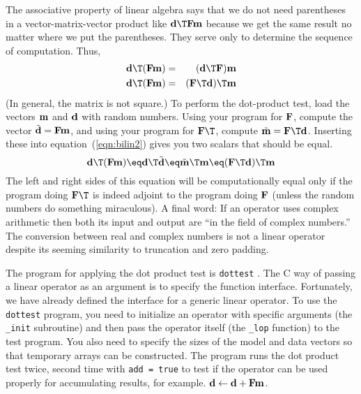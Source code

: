 \par
The associative property of linear algebra says that
we do not need parentheses in a vector-matrix-vector product
like $\bold d\T \bold F \bold m $ because we get the same
result no matter where we put the parentheses.
They serve only to determine the
sequence of computation.
Thus,
\begin{eqnarray}
\bold d\T ( \bold F \bold m ) &=& ( \bold d\T \bold F )  \bold m   \\
\bold d\T ( \bold F \bold m ) &=& ( \bold F\T \bold d )\T \bold m 
\label{eqn:bilin2}
\end{eqnarray}
(In general, the matrix is not square.)
To perform the dot-product test,
load the vectors $\bold m$ and $\bold d$ with random numbers.
Using your program for $\bold F$,
compute the vector $\tilde{\bold{d}} = \bold{F}\bold{m}$,
and using your program for $\bold{F}\T$,
compute $\tilde{\bold{m}} = \bold{F}\T\bold{d}$.
Inserting these into equation~(\ref{eqn:bilin2})
gives you two scalars that should be equal.
\begin{equation}
\bold{d}\T ( \bold F \bold m ) \eq
\bold d\T \tilde{\bold d} \eq \tilde{\bold m}\T \bold m
\eq ( \bold F\T \bold d )\T \bold m
\label{eqn:bilin}
\end{equation}
The left and right sides of this equation will be computationally equal
only if the program doing $\bold F\T$ is indeed adjoint
to the program doing $\bold F$
(unless the random numbers do something miraculous).
A final word: If an operator uses complex arithmetic
then both its input and output are ``in the field of complex numbers.''
The conversion between real and complex numbers is not a linear operator
despite its seeming similarity to truncation and zero padding.

\par
The program for applying the dot product test is \texttt{dottest}
. 
The C way of passing a linear operator
as an argument is to specify the function interface. Fortunately, we
have already defined the interface for a generic linear operator. To
use the \texttt{dottest} program, you need to initialize an operator
with specific arguments (the \texttt{\_init} subroutine) and then pass
the operator itself (the \texttt{\_lop} function) to the test program.
You also need to specify the sizes of the model and data vectors so
that temporary arrays can be constructed. The program runs the dot
product test twice, second time with \texttt{add = true} to test if
the operator can be used properly for accumulating results, for example.
$\bold d \leftarrow \bold d+\bold F\bold m$.

